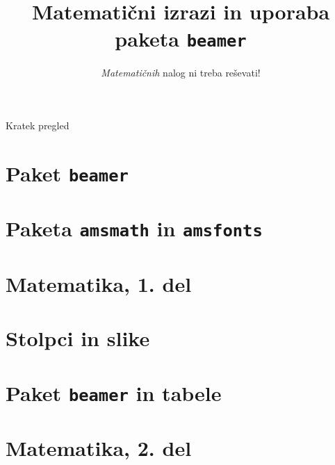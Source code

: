 \documentclass{beamer}
\theoremstyle{definition}
\theoremstyle{plain}
\begin{document}
\title{Matematični izrazi in uporaba paketa \texttt{beamer}}
\subtitle{\emph{Matematičnih} nalog ni treba reševati!}
\date{}
\begin{frame}
    \maketitle
\end{frame}

\begin{frame}{Kratek pregled}%
    \tableofcontents
\end{frame}

\section{Paket \texttt{beamer}}


\section{Paketa \texttt{amsmath} in \texttt{amsfonts}}


\section[Matematika, 1. del\\\large{Analiza, logika, množice}]{Matematika, 1. del}

\section{Stolpci in slike}

\section{Paket \texttt{beamer} in tabele}

\section[Matematika, 2. del\\\large{Zaporedja, algebra, grupe}]{Matematika, 2. del}
\end{document}
